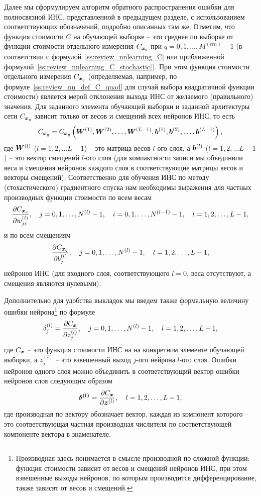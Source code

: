 \documentclass[a4paper,12pt,russian]{article} %
\begin{document}
Далее мы сформулируем алгоритм обратного распространения ошибки для полносвязной ИНС, представленной в предыдущем разделе, с использованием соответствующих обозначений, подробно описанных там же.
Отметим, что функция стоимости $C$ на обучающей выборке -- это среднее по выборке от функции стоимости отдельного измерения $C_{\bm{x}_q}$ при $q=0,  1, \ldots, M^{(trn)}-1$ (в соответствии с формулой~\eqref{ss:review_nnlearning_C} или приближенной формулой~\eqref{ss:review_nnlearning_C_stochastic}).
При этом функция стоимости отдельного измерения $C_{\bm{x}_q}$ (определяемая, например, по формуле~\eqref{ss:review_nn_def_C_quad} для случай выбора квадратичной функции стоимости) является мерой отклонения выхода ИНС от желаемого (правильного) значения.
Для заданного элемента обучающей выборки и заданной архитектуры сети $C_{\bm{x}_q}$ зависит только от весов и смещений всех нейронов ИНС, то есть
$$
	C_{\bm{x}_q} = C_{\bm{x}_q} \left(
		\bm{W}^{(1)}, \bm{W}^{(2)}, \ldots, \bm{W}^{(L-1)}, \bm{b}^{(1)}, \bm{b}^{(2)}, \ldots, \bm{b}^{(L-1)}
	\right),
$$
где $\bm{W}^{(l)}$ ($l=1, 2, \ldots L-1$) -- это матрица весов $l$-ого слоя, а $\bm{b}^{(l)}$ ($l=1, 2, \ldots L-1$) -- это вектор смещений $l$-ого слоя (для компактности записи мы объединили веса и смещения нейронов каждого слоя в соответствующие матрицы весов и векторы смещений).
Соответственно для обучения ИНС по методу (стохастического) градиентного спуска нам необходимы выражения для частных производных функции стоимости по всем весам 
$$
	\frac{\partial C_{\bm{x}_q}}{\partial w_{ji}^{(l)}}, \quad
	j = 0, 1, \ldots, N^{(l)}-1, \quad
	i = 0, 1, \ldots, N^{(l-1)}-1, \quad
	l = 1, 2, \ldots, L-1,
$$
и по всем смещениям
$$
	\frac{\partial C_{\bm{x}_q}}{\partial b_{j}^{(l)}}, \quad
	j = 0, 1, \ldots, N^{(l)}-1, \quad
	l = 1, 2, \ldots, L-1,
$$ 
нейронов ИНС (для входного слоя, соответствующего $l=0$, веса отсутствуют, а смещения являются нулевыми).

Дополнительно для удобства выкладок мы введем также формальную величину ошибки нейрона\footnote{
	Производная здесь понимается в смысле производной по сложной функции: функция стоимости зависит от весов и смещений нейронов ИНС, при этом взвешенные выходы нейронов, по которым производится дифференцирование, также зависят от весов и смещений.
}
по формуле
$$
	\delta_j^{(l)} = \frac{\partial C_{\bm{x}}}{\partial z_{j}^{(l)}}, \quad
	j = 0, 1, \ldots, N^{(l)}-1, \quad
	l = 1, 2, \ldots, L-1,
$$
где $C_{\bm{x}}$ -- это функция стоимости ИНС на на конкретном элементе обучающей выборки, а $z_{j}^{(l)}$ -- это взвешенный выход $j$-ого нейрона $l$-ого слоя.
Ошибки нейронов одного слоя можно объединить в соответствующий вектор ошибки нейронов слоя следующим образом
$$
	\bm{\delta^{(l)}} = \frac{\partial C_{\bm{x}}}{\partial \bm{z}^{(l)}}, \quad
	l = 1, 2, \ldots, L-1,
$$
где производная по вектору обозначает вектор, каждая из компонент которого -- это соответствующая частная производная числителя по соответствующей компоненте вектора в знаменателе.
\end{document}
